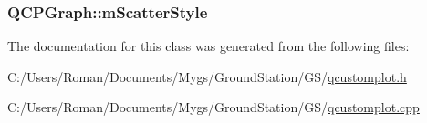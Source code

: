 \subsubsection[{m\+Scatter\+Style}]{ Q\+C\+P\+Graph\+::m\+Scatter\+Style\hspace{0.3cm}{\ttfamily [protected]}}\label{class_q_c_p_graph_a4aa36241f166ccd1f75fc8f24e4a3247}


The documentation for this class was generated from the following files\+:\begin{DoxyCompactItemize}
\item 
C\+:/\+Users/\+Roman/\+Documents/\+Mygs/\+Ground\+Station/\+G\+S/\hyperlink{qcustomplot_8h}{qcustomplot.\+h}\item 
C\+:/\+Users/\+Roman/\+Documents/\+Mygs/\+Ground\+Station/\+G\+S/\hyperlink{qcustomplot_8cpp}{qcustomplot.\+cpp}\end{DoxyCompactItemize}
